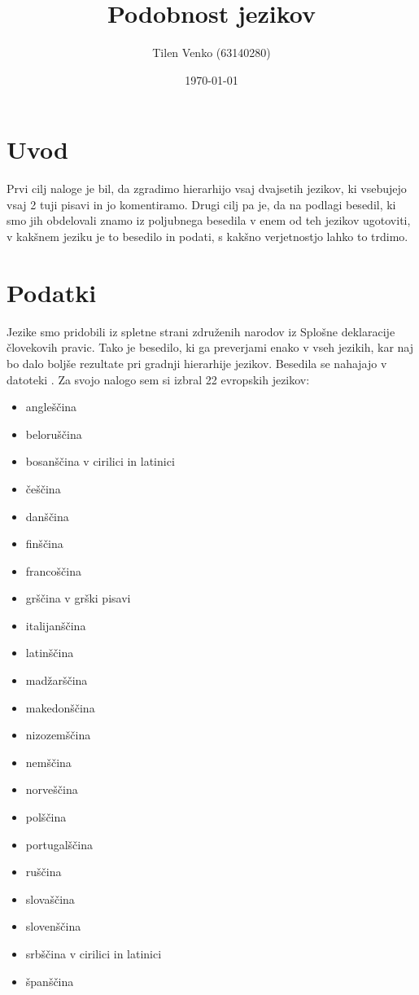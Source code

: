 \documentclass[a4paper,11pt]{article}
\title{Podobnost jezikov}
\author{Tilen Venko (63140280)}
\date{\today}
\begin{document}
\maketitle

\section{Uvod}

Prvi cilj naloge je bil, da zgradimo hierarhijo vsaj dvajsetih jezikov, ki vsebujejo vsaj 2 tuji pisavi in jo komentiramo. Drugi cilj pa je, da na podlagi besedil, ki smo jih obdelovali znamo iz poljubnega besedila v enem od teh jezikov ugotoviti, v kakšnem jeziku je to besedilo in podati, s kakšno verjetnostjo lahko to trdimo.

\section{Podatki}

Jezike smo pridobili iz spletne strani združenih narodov iz Splošne deklaracije človekovih pravic. Tako je besedilo, ki ga preverjami enako v vseh jezikih, kar naj bo dalo boljše rezultate pri gradnji hierarhije jezikov. Besedila se nahajajo v datoteki . Za svojo nalogo sem si izbral 22 evropskih jezikov:
\begin{itemize}
	\item angleščina
	\item beloruščina
	\item bosanščina v cirilici in latinici 
	\item češčina 
	\item danščina
	\item finščina
	\item francoščina
	\item grščina v grški pisavi
	\item italijanščina
	\item latinščina
	\item madžarščina
	\item makedonščina
	\item nizozemščina
	\item nemščina
	\item norveščina
	\item polščina
	\item portugalščina
	\item ruščina
	\item slovaščina
	\item slovenščina
	\item srbščina v cirilici in latinici
	\item španščina
\end{itemize}
\end{document}
